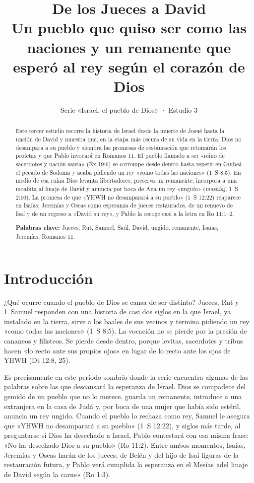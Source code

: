 \documentclass[11pt,letterpaper]{article}
\title{\color{ladrillo}\bfseries De los Jueces a David\\[4pt]\large\color{cafe}\mdseries Un pueblo que quiso ser como las naciones y un remanente que esperó al rey según el corazón de Dios}
\author{}\date{\color{sepia}Serie «Israel, el pueblo de Dios» · Estudio 3}
\begin{document}
\maketitle\thispagestyle{empty}

\begin{abstract}\noindent
Este tercer estudio recorre la historia de Israel desde la muerte de Josué hasta la unción de David y muestra que, en la etapa más oscura de su vida en la tierra, Dios no desampara a su pueblo y siembra las promesas de restauración que retomarán los profetas y que Pablo invocará en Romanos 11. El pueblo llamado a ser «reino de sacerdotes y nación santa» (Éx 19:6) se corrompe desde dentro hasta repetir en Guibeá el pecado de Sodoma y acaba pidiendo un rey «como todas las naciones» (1~S 8:5). En medio de esa ruina Dios levanta libertadores, preserva un remanente, incorpora a una moabita al linaje de David y anuncia por boca de Ana un rey «ungido» (\emph{mashíaj}, 1~S 2:10). La promesa de que «YHWH no desamparará a su pueblo» (1~S 12:22) reaparece en Isaías, Jeremías y Oseas como esperanza de jueces restaurados, de un renuevo de Isaí y de un regreso a «David su rey», y Pablo la recoge casi a la letra en Ro 11:1--2.
\par\smallskip\noindent\textbf{Palabras clave:} Jueces, Rut, Samuel, Saúl, David, ungido, remanente, Isaías, Jeremías, Romanos 11.
\end{abstract}

\section{Introducción}

¿Qué ocurre cuando el pueblo de Dios se cansa de ser distinto? Jueces, Rut y 1~Samuel responden con una historia de casi dos siglos en la que Israel, ya instalado en la tierra, sirve a los baales de sus vecinos y termina pidiendo un rey «como todas las naciones» (1~S 8:5). La vocación no se pierde por la presión de cananeos y filisteos. Se pierde desde dentro, porque levitas, sacerdotes y tribus hacen «lo recto ante sus propios ojos» en lugar de lo recto ante los ojos de YHWH (Dt 12:8, 25).

Es precisamente en este período sombrío donde la serie encuentra algunas de las palabras sobre las que descansará la esperanza de Israel. Dios se compadece del gemido de un pueblo que no lo merece, guarda un remanente, introduce a una extranjera en la casa de Judá y, por boca de una mujer que había sido estéril, anuncia un rey ungido. Cuando el pueblo lo rechaza como rey, Samuel le asegura que «YHWH no desamparará a su pueblo» (1~S 12:22), y siglos más tarde, al preguntarse si Dios ha desechado a Israel, Pablo contestará con esa misma frase: «No ha desechado Dios a su pueblo» (Ro 11:2). Entre ambos momentos, Isaías, Jeremías y Oseas harán de los jueces, de Belén y del hijo de Isaí figuras de la restauración futura, y Pablo verá cumplida la esperanza en el Mesías «del linaje de David según la carne» (Ro 1:3).
\end{document}
